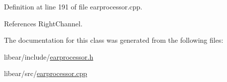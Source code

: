 \-Definition at line 191 of file earprocessor.\-cpp.



\-References \-Right\-Channel.



\-The documentation for this class was generated from the following files\-:\begin{DoxyCompactItemize}
\item 
libear/include/\hyperlink{earprocessor_8h}{earprocessor.\-h}\item 
libear/src/\hyperlink{earprocessor_8cpp}{earprocessor.\-cpp}\end{DoxyCompactItemize}
